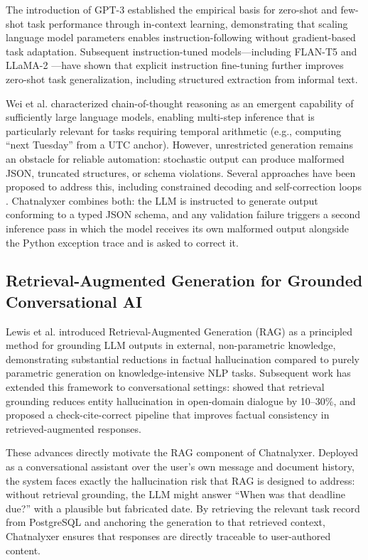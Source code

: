 The introduction of GPT-3 \cite{brown2020language} established the empirical basis for zero-shot and few-shot task performance through in-context learning, demonstrating that scaling language model parameters enables instruction-following without gradient-based task adaptation. Subsequent instruction-tuned models—including FLAN-T5 \cite{chung2022scaling} and LLaMA-2 \cite{touvron2023llama}—have shown that explicit instruction fine-tuning further improves zero-shot task generalization, including structured extraction from informal text.

Wei et al. \cite{wei2022emergent} characterized chain-of-thought reasoning as an emergent capability of sufficiently large language models, enabling multi-step inference that is particularly relevant for tasks requiring temporal arithmetic (e.g., computing ``next Tuesday'' from a UTC anchor). However, unrestricted generation remains an obstacle for reliable automation: stochastic output can produce malformed JSON, truncated structures, or schema violations. Several approaches have been proposed to address this, including constrained decoding \cite{willard2023efficient} and self-correction loops \cite{madaan2023selfrefine}. Chatnalyxer combines both: the LLM is instructed to generate output conforming to a typed JSON schema, and any validation failure triggers a second inference pass in which the model receives its own malformed output alongside the Python exception trace and is asked to correct it.

\subsection{Retrieval-Augmented Generation for Grounded Conversational AI}

Lewis et al. \cite{lewis2020rag} introduced Retrieval-Augmented Generation (RAG) as a principled method for grounding LLM outputs in external, non-parametric knowledge, demonstrating substantial reductions in factual hallucination compared to purely parametric generation on knowledge-intensive NLP tasks. Subsequent work has extended this framework to conversational settings: \cite{shuster2021retrieval} showed that retrieval grounding reduces entity hallucination in open-domain dialogue by 10--30\%, and \cite{peng2023check} proposed a check-cite-correct pipeline that improves factual consistency in retrieved-augmented responses.

These advances directly motivate the RAG component of Chatnalyxer. Deployed as a conversational assistant over the user's own message and document history, the system faces exactly the hallucination risk that RAG is designed to address: without retrieval grounding, the LLM might answer ``When was that deadline due?'' with a plausible but fabricated date. By retrieving the relevant task record from PostgreSQL and anchoring the generation to that retrieved context, Chatnalyxer ensures that responses are directly traceable to user-authored content.

